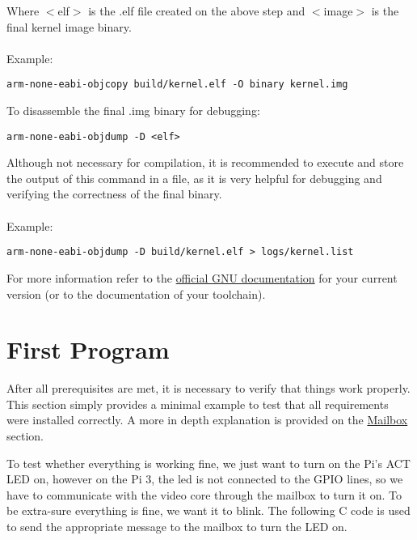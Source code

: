 \documentclass[12pt]{book}
\begin{document}
Where $<$elf$>$ is the .elf file created on the above step and $<$image$>$ is the final kernel image binary. 
\\~\\
Example:
\begin{lstlisting}[style = bash, xleftmargin=0\textwidth]
	arm-none-eabi-objcopy build/kernel.elf -O binary kernel.img
\end{lstlisting}

To \hypertarget{disassemble}{disassemble} the final .img binary for debugging:
\begin{lstlisting}[style = bash, xleftmargin=0\textwidth]
	arm-none-eabi-objdump -D <elf>
\end{lstlisting}

Although not necessary for compilation, it is recommended to execute and store the output of this command in a file, as it is very helpful for debugging and verifying the correctness of the final binary.
\\~\\
Example:
\begin{lstlisting}[style = bash, xleftmargin=0\textwidth]
	arm-none-eabi-objdump -D build/kernel.elf > logs/kernel.list
\end{lstlisting}

For more information refer to the \href{https://gcc.gnu.org/onlinedocs/}{official GNU documentation} for your current version (or to the documentation of your toolchain).

\section{First Program}
\label{sec:frist program}

After all prerequisites are met, it is necessary to verify that things work properly. This section simply provides a minimal example to test that all requirements were installed correctly. A more in depth explanation is provided on the \hyperref[sec:mailbox]{Mailbox} section.

To test whether everything is working fine, we just want to turn on the Pi's ACT LED on, however on the Pi 3, the led is not connected to the GPIO lines, so we have to communicate with the video core through the mailbox to turn it on. To be extra-sure everything is fine, we want it to blink. The following C code is used to send the appropriate message to the mailbox to turn the LED on.
\end{document}
